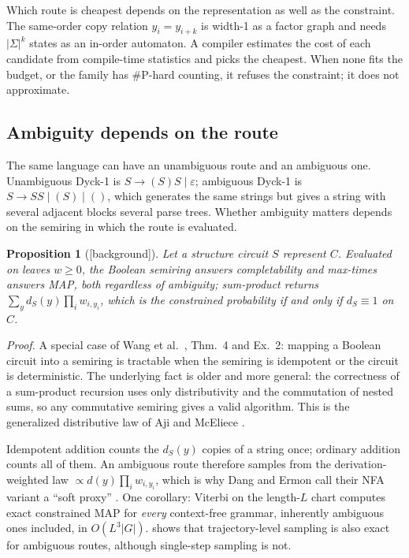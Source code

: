 \documentclass[11pt]{article}
\newtheorem{proposition}[theorem]{Proposition}
\theoremstyle{definition}
\newcommand{\status}[1]{\textsf{\small[#1]}}
\newcommand{\proofref}[1]{\par\noindent\textit{Proof.} #1\par\smallskip}
\begin{document}
Which route is cheapest depends on the representation as well as the constraint. The same-order copy relation
$y_i=y_{i+k}$ is width-1 as a factor graph and needs $|\Sigma|^k$ states as an in-order automaton. A compiler
estimates the cost of each candidate from compile-time statistics and picks the cheapest. When none fits the
budget, or the family has \#P-hard counting, it refuses the constraint; it does not approximate.

\subsection{Ambiguity depends on the route}
The same language can have an unambiguous route and an ambiguous one. Unambiguous Dyck-1 is
$S\to(S)S\mid\varepsilon$; ambiguous Dyck-1 is $S\to SS\mid(S)\mid()$, which generates the same strings but gives
a string with several adjacent blocks several parse trees. Whether ambiguity matters depends on the semiring in
which the route is evaluated.

\begin{proposition}[\status{background}]\label{prop:semiring}
Let a structure circuit $S$ represent $C$. Evaluated on leaves $w\ge0$, the Boolean semiring answers
completability and max-times answers MAP, both regardless of ambiguity; sum-product returns
$\sum_yd_S(y)\prod_iw_{i,y_i}$, which is the constrained probability \emph{if and only if} $d_S\equiv1$ on $C$.
\end{proposition}
\proofref{A special case of Wang et al.\ \cite{wang2024atlas}, Thm.~4 and Ex.~2: mapping a Boolean circuit into a
semiring is tractable when the semiring is idempotent or the circuit is deterministic. The underlying fact is
older and more general: the correctness of a sum-product recursion uses only distributivity and the
commutation of nested sums, so any commutative semiring gives a valid algorithm. This is the generalized
distributive law of Aji and McEliece \cite{aji2000}.}

Idempotent addition counts the $d_S(y)$ copies of a string once; ordinary addition counts all of them. An
ambiguous route therefore samples from the derivation-weighted law $\propto d(y)\prod_iw_{i,y_i}$, which is why
Dang and Ermon call their NFA variant a ``soft proxy'' \cite{de26}. One corollary: Viterbi on the length-$L$ chart
computes exact constrained MAP for \emph{every} context-free grammar, inherently ambiguous ones included, in
$O(L^3|G|)$.  shows that trajectory-level sampling is also exact for ambiguous routes, although
single-step sampling is not.
\end{document}
